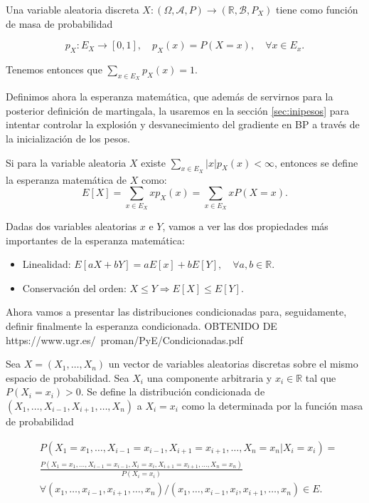\begin{definicion}
	Una variable aleatoria discreta $X: (\Omega, \mathcal{A}, P) \rightarrow (\mathbb{R}, \mathcal{B}, P_X)$ tiene como función de masa de probabilidad
	
	\begin{equation*}
		p_X: E_X \rightarrow [0,1], \quad p_X(x) = P(X=x), \quad \forall x \in E_x.
	\end{equation*}

	Tenemos entonces que $\sum_{x \in E_X} p_X(x)=1$.
\end{definicion}


Definimos ahora la esperanza matemática, que además de servirnos para la posterior definición de martingala, la usaremos en la sección \ref{sec:inipesos} para intentar controlar la explosión y desvanecimiento del gradiente en BP a través de la inicialización de los pesos.

\begin{definicion}
	Si para la variable aleatoria $X$ existe $\sum_{x \in E_X} |x| p_X(x) < \infty$, entonces se define la esperanza matemática de $X$ como:
	\begin{equation*}
		E[X]= \sum_{x \in E_X} x p_X(x) = \sum_{x \in E_X} x P(X=x).
	\end{equation*}
\end{definicion}

Dadas dos variables aleatorias $x$ e $Y$, vamos a ver las dos propiedades más importantes de la esperanza matemática:

\begin{itemize}
	\item Linealidad: $E[aX+bY]=aE[x]+bE[Y], \quad \forall a,b \in \mathbb{R}$.

	\item Conservación del orden: $ X \leq Y \Rightarrow E[X] \leq E[Y]$.

\end{itemize}

Ahora vamos a presentar las distribuciones condicionadas para, seguidamente, definir finalmente la esperanza condicionada. OBTENIDO DE https://www.ugr.es/~proman/PyE/Condicionadas.pdf

\begin{definicion}
	Sea $X=(X_1, \ldots, X_n)$ un vector de variables aleatorias discretas sobre el mismo espacio de probabilidad. Sea $X_i$ una componente arbitraria y $x_i \in \mathbb{R}$ tal que $P(X_i=x_i)>0$. Se define la distribución condicionada de $(X_1, \ldots, X_{i-1}, X_{i+1}, \ldots, X_n)$ a $X_i=x_i$ como la determinada por la función masa de probabilidad

\begin{align*}
	&P(X_1=x_1, \ldots, X_{i-1}=x_{i-1}, X_{i+1}=x_{i+1}, \ldots, X_n=x_n | X_i=x_i)= \\
	&\frac{P(X_1=x_1, \ldots, X_{i-1}=x_{i-1}, X_i=x_i,  X_{i+1}=x_{i+1}, \ldots, X_n=x_n )}{P(X_i=x_i)} \\
	& \forall (x_1, \ldots, x_{i-1}, x_{i+1}, \ldots, x_n) / (x_1, \ldots, x_{i-1}, x_i, x_{i+1}, \ldots, x_n) \in E.
\end{align*}
\end{definicion}

